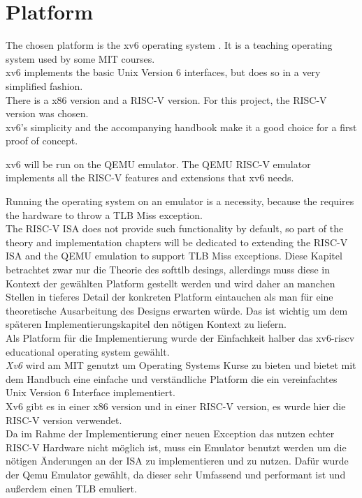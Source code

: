 \section{Platform}
The chosen platform is the xv6 operating system \cite{xv6source}. It is a teaching operating system
used by some MIT courses.\\
xv6 implements the basic Unix Version 6 interfaces, but does so in a very simplified fashion.\\
There is a x86 version and a RISC-V version. For this project, the RISC-V version was chosen.\\
xv6's simplicity and the accompanying handbook \cite{cox2011xv6} make it a good choice for a first
proof of concept.

xv6 will be run on the QEMU \cite{QEMUSource2024} emulator. The QEMU RISC-V emulator implements
all the RISC-V features and extensions that xv6 needs.

Running the operating system on an emulator is a necessity, because the requires the hardware to
throw a TLB Miss exception.\\ The RISC-V ISA does not provide such functionality by default, so
part of the theory and implementation chapters will be dedicated to extending the RISC-V ISA and
the QEMU emulation to support TLB Miss exceptions.
Diese Kapitel betrachtet zwar nur die Theorie des softtlb desings, allerdings muss diese in Kontext
der gewählten Platform gestellt werden und wird daher an manchen Stellen in tieferes Detail der konkreten
Platform eintauchen als man für eine theoretische Ausarbeitung des Designs erwarten würde.
Das ist wichtig um dem späteren Implementierungskapitel den nötigen Kontext zu liefern.\\
Als Platform für die Implementierung wurde der Einfachkeit halber das xv6-riscv educational operating
system \cite{cox2011xv6} gewählt.\\
\textit{Xv6} wird am MIT genutzt um Operating Systems Kurse zu bieten und bietet mit dem Handbuch eine
einfache und verständliche Platform die ein vereinfachtes Unix Version 6 Interface implementiert.\\
Xv6 gibt es in einer x86 version und in einer RISC-V version, es wurde hier die RISC-V version verwendet.
\\
Da im Rahme der Implementierung einer neuen Exception das nutzen echter RISC-V Hardware nicht möglich
ist, muss ein Emulator benutzt werden um die nötigen Änderungen an der ISA zu implementieren und zu nutzen.
Dafür wurde der Qemu Emulator gewählt, da dieser sehr Umfassend und performant ist und außerdem einen
TLB emuliert.

